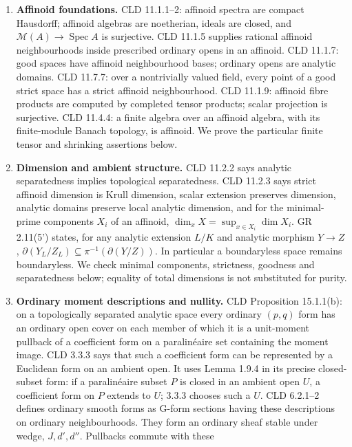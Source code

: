 \documentclass[
  11pt,
]{article}
\begin{document}
\begin{enumerate}
\def\labelenumi{\arabic{enumi}.}
\item
  \textbf{Affinoid foundations.} CLD 11.1.1--2: affinoid spectra are
  compact Hausdorff; affinoid algebras are noetherian, ideals are
  closed, and \(\mathcal M(A)\to\operatorname{Spec}A\) is surjective.
  CLD 11.1.5 supplies rational affinoid neighbourhoods inside prescribed
  ordinary opens in an affinoid. CLD 11.1.7: good spaces have affinoid
  neighbourhood bases; ordinary opens are analytic domains. CLD 11.7.7:
  over a nontrivially valued field, every point of a good strict space
  has a strict affinoid neighbourhood. CLD 11.1.9: affinoid fibre
  products are computed by completed tensor products; scalar projection
  is surjective. CLD 11.4.4: a finite algebra over an affinoid algebra,
  with its finite-module Banach topology, is affinoid. We prove the
  particular finite tensor and shrinking assertions below.
\item
  \textbf{Dimension and ambient structure.} CLD 11.2.2 says analytic
  separatedness implies topological separatedness. CLD 11.2.3 says
  strict affinoid dimension is Krull dimension, scalar extension
  preserves dimension, analytic domains preserve local analytic
  dimension, and for the minimal-prime components \(X_i\) of an
  affinoid, \(\dim_xX=\sup_{x\in X_i}\dim X_i\). GR 2.11(5') states, for
  any analytic extension \(L/K\) and analytic morphism \(Y\to Z\),
  \(\partial(Y_L/Z_L)\subseteq\pi^{-1}(\partial(Y/Z))\). In particular a
  boundaryless space remains boundaryless. We check minimal components,
  strictness, goodness and separatedness below; equality of total
  dimensions is not substituted for purity.
\item
  \textbf{Ordinary moment descriptions and nullity.} CLD Proposition
  15.1.1(b): on a topologically separated analytic space every ordinary
  \((p,q)\) form has an ordinary open cover on each member of which it
  is a unit-moment pullback of a coefficient form on a paralinéaire set
  containing the moment image. CLD 3.3.3 says that such a coefficient
  form can be represented by a Euclidean form on an ambient open. It
  uses Lemma 1.9.4 in its precise closed-subset form: if a paralinéaire
  subset \(P\) is closed in an ambient open \(U\), a coefficient form on
  \(P\) extends to \(U\); 3.3.3 chooses such a \(U\). CLD 6.2.1--2
  defines ordinary smooth forms as G-form sections having these
  descriptions on ordinary neighbourhoods. They form an ordinary sheaf
  stable under wedge, \(J,d',d''\). Pullbacks commute with these

\end{enumerate}
\end{document}

